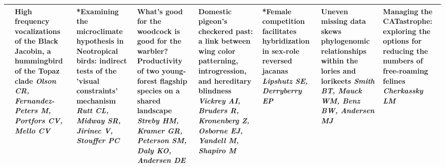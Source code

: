 \begin{tabular}{|x{0.85cm}|x{2.85cm}|x{2.85cm}|x{2.85cm}|x{2.85cm}|a{2.85cm}|x{2.85cm}|a{2.85cm}|}
&High frequency vocalizations of the Black Jacobin, a hummingbird of the Topaz clade \newline \newline \textit{Olson CR, Fernandez-Peters M, Portfors CV, Mello CV} & *Examining the microclimate hypothesis in Neotropical birds: indirect tests of the 'visual constraints' mechanism \newline \newline \textit{Rutt CL, Midway SR, Jirinec V, Stouffer PC} & What's good for the woodcock is good for the warbler? Productivity of two young-forest flagship species on a shared landscape \newline \newline \textit{Streby HM, Kramer GR, Peterson SM, Daly KO, Andersen DE} & Domestic pigeon's checkered past: a link between wing color patterning, introgression, and hereditary blindness \newline \newline \textit{Vickrey AI, Bruders R, Kronenberg Z, Osborne EJ, Yandell M, Shapiro M} & *Female competition facilitates hybridization in sex-role reversed jacanas \newline \newline \textit{Lipshutz SE, Derryberry EP} & Uneven missing data skews phylogenomic relationships within the lories and lorikeets \newline \newline \textit{Smith BT, Mauck WM, Benz BW, Andersen MJ} & Managing the CATastrophe: exploring the options for reducing the numbers of free-roaming felines \newline \newline \textit{Cherkassky LM}\\
\hline

\end{tabular}
